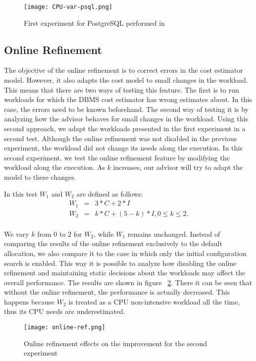 \begin{figure}[ht]
 \centering
 \texttt{[image: CPU-var-psql.png]}
 \caption{First experiment for PostgreSQL performed in \cite{Soror:2008:AVM:1376616.1376711}}
 \label{fig:cpuvar-psql}
\end{figure} 

\subsection{Online Refinement}

The objective of the online refinement is to correct errors in the cost estimator model. However, it also adapts the cost model to small changes in the workload. This means that there are two ways of testing this feature. The first is to run workloads for which the DBMS cost estimator has wrong estimates about. In this case, the errors need to be known beforehand. The second way of testing it is by analyzing how the advisor behaves for small changes in the workload. Using this second approach, we adapt the workloads presented in the first experiment in a second test. Although the online refinement was not disabled in the previous experiment, the workload did not change its needs along the execution. In this second experiment, we test the online refinement feature by modifying the workload along the execution. As $k$ increases, our advisor will try to adapt the model to these changes.

In this test $W_{1}$ and $W_{2}$ are defined as follows:
\begin{eqnarray*}
 W_{1} &=& 3*C + 2*I \\
 W_{2} &=& k*C + (5-k)*I, 0 \leq k \leq 2. \\
\end{eqnarray*}

We vary $k$ from $0$ to $2$ for $W_{2}$, while $W_{1}$ remains unchanged. Instead of comparing the results of the online refinement exclusively to the default allocation, we also compare it to the case in which only the initial configuration search is enabled. This way it is possible to analyze how disabling the online refinement and maintaining static decisions about the workloads may affect the overall performance. The results are shown in figure ~\ref{fig:online-ref-pf}. There it can be seen that without the online refinement, the performance is actually decreased. This happens because $W_{2}$ is treated as a CPU non-intensive workload all the time, thus its CPU needs are underestimated.
\begin{figure}[ht]
 \centering
 \texttt{[image: online-ref.png]}
 \caption{Online refinement effects on the improvement for the second experiment}
 \label{fig:online-ref-pf}
\end{figure} 

